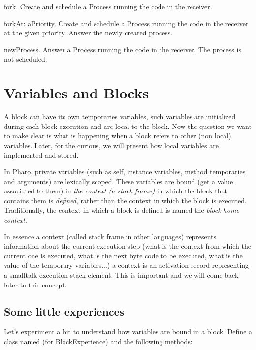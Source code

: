 \documentclass[a4paper,10pt,twoside]{book}
\begin{document}
\begin{description}
\item{\textsf{fork}}. Create and schedule a Process running the code in the receiver.

\item{\textsf{forkAt: aPriority}}. Create and schedule a Process running the code in the receiver at the given priority. Answer the newly created process.

\item{\textsf{newProcess}}. Answer a Process running the code in the receiver. The process is not scheduled.
\end{description}


\section{Variables and Blocks}
A block can have its own temporaries variables, such variables are initialized during each block execution and are local to the block. Now the question we want to make clear is what is happening when a block refers to other (non local) variables. Later, for the curious, we will present how local variables are implemented and stored.

In Pharo, private variables (such as self, instance variables, method temporaries and arguments) are lexically scoped. These variables are bound (get a value associated to them) in \emph{the context (a stack frame)} in which the block that contains them is \emph{defined}, rather than the context in which the block is executed.  Traditionally, the context in which a block is defined is named the \emph{block home context}.

In essence a context (called stack frame in other languages) represents information about the current execution step (what is the context from which the current one is executed, what is the next byte code to be executed, what is the value of the temporary variables...) a context is an activation record representing a smalltalk execution stack element. This is important and we will come back later to this concept.

\subsection{Some little experiences}
Let's experiment a bit to understand how variables are bound in a block. Define a class named  (for BlockExperience) and the following methods:
\end{document}
